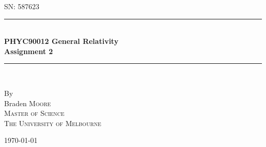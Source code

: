 \documentclass[a4paper]{article} %
\begin{document}
\pagestyle{empty}

\newcommand{\HRule}{\rule{\linewidth}{0.5mm}}

\begin{titlepage}

    \begin{center}
        \textsc{\large SN: 587623}\\[6cm]

        \HRule \\[0.5cm]
		\Huge \textbf{PHYC90012 General Relativity}\\[0.5cm]
        \huge \textbf{Assignment 2}\\[0.5cm] 
        \HRule \\[1.5cm]
        \begin{minipage}{0.4\textwidth}
        \begin{center}

        \large By \\[0.75cm]
        \huge Braden \scshape Moore \\[0.5cm]
        \normalsize \normalfont Master of Science \\
        The University of Melbourne \\

        \end{center}
        \end{minipage}

        \vfill

        \large \today
    \end{center}

\newpage
\end{titlepage}
\pagestyle{fancy}
\lfoot{\textsc{\today}}
\setcounter{page}{1}
\setcounter{section}{1}
\end{document}
